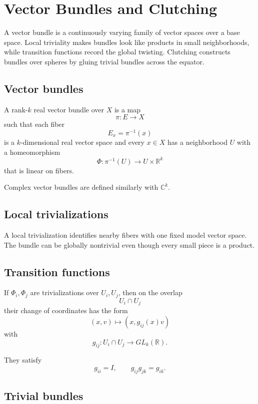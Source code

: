 ﻿\chapter{Vector Bundles and Clutching}
\label{ch:viii30-vector-bundles-clutching}

A vector bundle is a continuously varying family of vector spaces over a base
space.  Local triviality makes bundles look like products in small
neighborhoods, while transition functions record the global twisting.
Clutching constructs bundles over spheres by gluing trivial bundles across the
equator.

\section{Vector bundles}

\begin{definition}
\label{def:viii30-vector-bundle}
A rank-\(k\) real vector bundle over \(X\) is a map
\[
\pi:E\to X
\]
such that each fiber
\[
E_x=\pi^{-1}(x)
\]
is a \(k\)-dimensional real vector space and every \(x\in X\) has a
neighborhood \(U\) with a homeomorphism
\[
\Phi:\pi^{-1}(U)\to U\times\mathbb R^k
\]
that is linear on fibers.
\end{definition}

Complex vector bundles are defined similarly with \(\mathbb C^k\).

\section{Local trivializations}

A local trivialization identifies nearby fibers with one fixed model vector
space.  The bundle can be globally nontrivial even though every small piece is
a product.

\section{Transition functions}

If \(\Phi_i,\Phi_j\) are trivializations over \(U_i,U_j\), then on the overlap
\[
U_i\cap U_j
\]
their change of coordinates has the form
\[
(x,v)\longmapsto(x,g_{ij}(x)v)
\]
with
\[
g_{ij}:U_i\cap U_j\to GL_k(\mathbb R).
\]

They satisfy
\[
g_{ii}=I,\qquad
g_{ij}g_{jk}=g_{ik}.
\]

\section{Trivial bundles}

